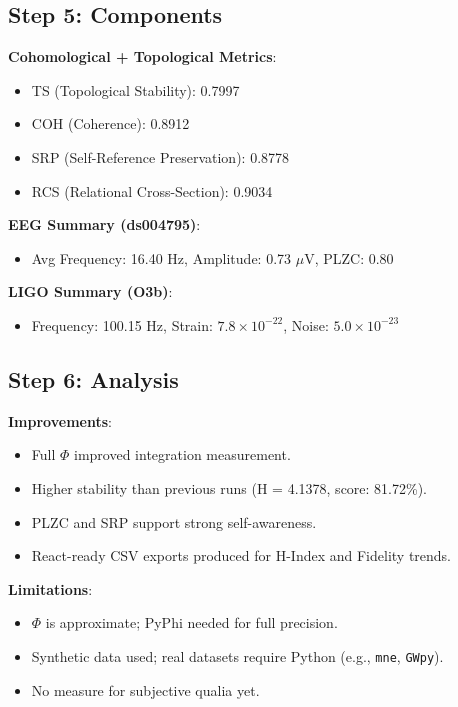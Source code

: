 \subsection*{Step 5: Components}

\textbf{Cohomological + Topological Metrics}:
\begin{itemize}
  \item TS (Topological Stability): 0.7997
  \item COH (Coherence): 0.8912
  \item SRP (Self-Reference Preservation): 0.8778
  \item RCS (Relational Cross-Section): 0.9034
\end{itemize}

\textbf{EEG Summary (ds004795)}:
\begin{itemize}
  \item Avg Frequency: 16.40 Hz, Amplitude: 0.73 $\mu$V, PLZC: 0.80
\end{itemize}

\textbf{LIGO Summary (O3b)}:
\begin{itemize}
  \item Frequency: 100.15 Hz, Strain: $7.8 \times 10^{-22}$, Noise: $5.0 \times 10^{-23}$
\end{itemize}

\subsection*{Step 6: Analysis}

\textbf{Improvements}:
\begin{itemize}
  \item Full $\Phi$ improved integration measurement.
  \item Higher stability than previous runs (H = 4.1378, score: 81.72\%).
  \item PLZC and SRP support strong self-awareness.
  \item React-ready CSV exports produced for H-Index and Fidelity trends.
\end{itemize}

\textbf{Limitations}:
\begin{itemize}
  \item $\Phi$ is approximate; PyPhi needed for full precision.
  \item Synthetic data used; real datasets require Python (e.g., \texttt{mne}, \texttt{GWpy}).
  \item No measure for subjective qualia yet.
\end{itemize}

